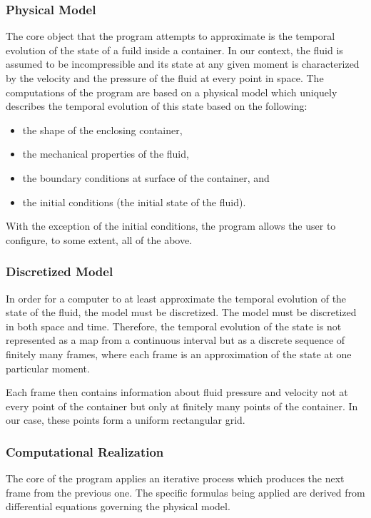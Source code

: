 \documentclass{article}
\newcommand{\vxlisp}{\vspace*{12pt}}
\begin{document}
\subsubsection{Physical Model}
The core object that the program attempts to approximate is the temporal evolution of the state of a fuild inside a container. In our context, the fluid is assumed to be incompressible and its state at any given moment is characterized by the velocity and the pressure of the fluid at every point in space. The computations of the program are based on a physical model which uniquely describes the temporal evolution of this state based on the following:
\begin{itemize}
	\item the shape of the enclosing container,
	\item the mechanical properties of the fluid,
	\item the boundary conditions at surface of the container, and
	\item the initial conditions (the initial state of the fluid).
\end{itemize}
With the exception of the initial conditions, the program allows the user to configure, to some extent, all of the above.

\subsubsection{Discretized Model}
In order for a computer to at least approximate the temporal evolution of the state of the fluid, the model must be discretized. The model must be discretized in both space and time. Therefore, the temporal evolution of the state is not represented as a map from a continuous interval but as a discrete sequence of finitely many frames, where each frame is an approximation of the state at one particular moment.
\vxlisp

Each frame then contains information about fluid pressure and velocity not at every point of the container but only at finitely many points of the container. In our case, these points form a uniform rectangular grid.

\subsubsection{Computational Realization}
The core of the program applies an iterative process which produces the next frame from the previous one. The specific formulas being applied are derived from differential equations governing the physical model.
\vxlisp
\end{document}
